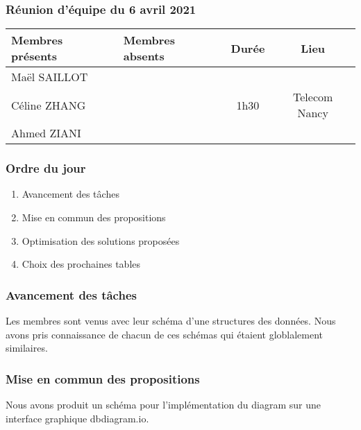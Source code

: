 


% 
\subsubsection*{\large{Réunion d'équipe du 6 avril 2021}}
\begin{center}
\begin{tabular}{| l | l || c | c |}
    \hline
    Membres présents & Membres absents & Durée & Lieu \\
    \hline
    Maël SAILLOT & & & \\ Céline ZHANG & & 1h30 & Telecom Nancy \\ Ahmed ZIANI & & & \\
    \hline
\end{tabular}
\end{center}

\subsubsection*{Ordre du jour}
\begin{enumerate}
    \item Avancement des tâches
    \item Mise en commun des propositions
    \item Optimisation des solutions proposées
    \item Choix des prochaines tables
\end{enumerate}

\subsubsection*{Avancement des tâches}
Les membres sont venus avec leur schéma d'une structures des données. Nous avons pris connaissance de chacun de ces schémas qui étaient globlalement similaires.

\subsubsection*{Mise en commun des propositions}
Nous avons produit un schéma pour l'implémentation du diagram sur une interface graphique \textsf{dbdiagram.io}.

